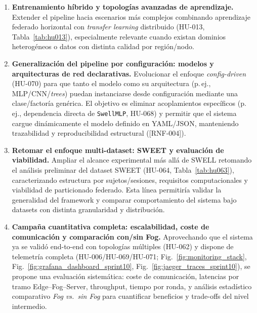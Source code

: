 \documentclass{report}
\begin{document}
\begin{enumerate}
  \item \textbf{Entrenamiento híbrido y topologías avanzadas de aprendizaje.}  
  Extender el pipeline hacia escenarios más complejos combinando aprendizaje federado horizontal con \textit{transfer learning} distribuido (HU-013, Tabla~\ref{tab:hu013}), especialmente relevante cuando existan dominios heterogéneos o datos con distinta calidad por región/nodo.

  \item \textbf{Generalización del pipeline por configuración: modelos y arquitecturas de red declarativas.}  
  Evolucionar el enfoque \textit{config-driven} (HU-070) para que tanto el modelo como su arquitectura (p.\,ej., MLP/CNN/\textit{trees}) puedan instanciarse desde configuración mediante una clase/factoría genérica. El objetivo es eliminar acoplamientos específicos (p.\,ej., dependencia directa de \texttt{SwellMLP}, HU-068) y permitir que el sistema cargue dinámicamente el modelo definido en YAML/JSON, manteniendo trazabilidad y reproducibilidad estructural ([RNF-004]).

  \item \textbf{Retomar el enfoque multi-dataset: SWEET y evaluación de viabilidad.}  
  Ampliar el alcance experimental más allá de SWELL retomando el análisis preliminar del dataset SWEET (HU-064, Tabla~\ref{tab:hu063}), caracterizando estructura por sujetos/sesiones, requisitos computacionales y viabilidad de particionado federado. Esta línea permitiría validar la generalidad del framework y comparar comportamiento del sistema bajo datasets con distinta granularidad y distribución.

  \item \textbf{Campaña cuantitativa completa: escalabilidad, coste de comunicación y comparación con/sin Fog.}  
  Aprovechando que el sistema ya se validó end-to-end con topologías múltiples (HU-062) y dispone de telemetría completa (HU-006/HU-069/HU-071; Fig.~\ref{fig:monitoring_stack}, Fig.~\ref{fig:grafana_dashboard_sprint10}, Fig.~\ref{fig:jaeger_traces_sprint10}), se propone una evaluación sistemática: coste de comunicación, latencias por tramo Edge--Fog--Server, throughput, tiempo por ronda, y análisis estadístico comparativo \textit{Fog vs.\ sin Fog} para cuantificar beneficios y trade-offs del nivel intermedio.

\end{enumerate}




\printglossary[title=Glosario] %





\printbibliography
\end{document}
